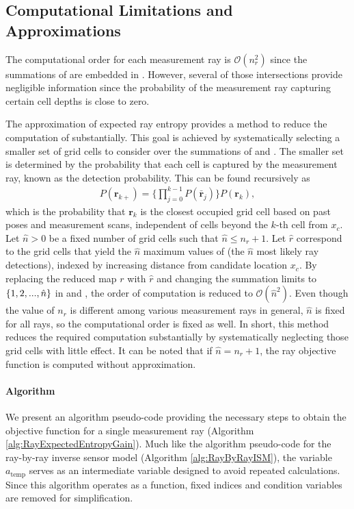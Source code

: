 \subsection{Computational Limitations and Approximations}

The computational order for each measurement ray is $\mathcal O(n_{r}^2)$ since the summations of  are embedded in . However, several of those intersections provide negligible information since the probability of the measurement ray capturing certain cell depths is close to zero.

The approximation of expected ray entropy provides a method to reduce the computation of  substantially. This goal is achieved by systematically selecting a smaller set of grid cells to consider over the summations of  and .
The smaller set is determined by the probability that each cell is captured by the measurement ray, known as the detection probability. This can be found recursively as
\begin{align}
\label{eqn:ProbOfFirstCell}
P(\mathbf{r}_{k+})%
=\bigg\{\prod_{j=0}^{k-1}P(\bar{\mathbf{r}}_{j})\bigg\}P(\mathbf{r}_{k}),
\end{align}
which is the probability that $\mathbf{r}_{k}$ is the closest occupied grid cell based on past poses and measurement scans, independent of cells beyond the $k$-th cell from $x_c$.
Let $\hat n>0$ be a fixed number of grid cells such that $\hat n\leq n_{r}+1$.
Let $\hat{r}$ correspond to the grid cells that yield the $\hat{n}$ maximum values of  (the $\hat n$ most likely ray detections), indexed by increasing distance from candidate location $x_c$.
By replacing the reduced map $r$ with $\hat{r}$ and changing the summation limits to $\left\{ 1,2,...,\hat n \right\}$ in  and , the order of computation is reduced to $\mathcal O({\hat{n}}^2)$.
Even though the value of $n_{r}$ is different among various measurement rays in general, $\hat n$ is fixed for all rays, so the computational order is fixed as well.
In short, this method reduces the required computation substantially by systematically neglecting those grid cells with little effect. It can be noted that if $\hat n=n_{r}+1$, the ray objective function is computed without approximation.


\paragraph{Algorithm} We present an algorithm pseudo-code providing the necessary steps to obtain the objective function for a single measurement ray (Algorithm \ref{alg:RayExpectedEntropyGain}). Much like the algorithm pseudo-code for the ray-by-ray inverse sensor model (Algorithm \ref{alg:RayByRayISM}), the variable $a_\text{temp}$ serves as an intermediate variable designed to avoid repeated calculations.
Since this algorithm operates as a function, fixed indices and condition variables are removed for simplification. 

